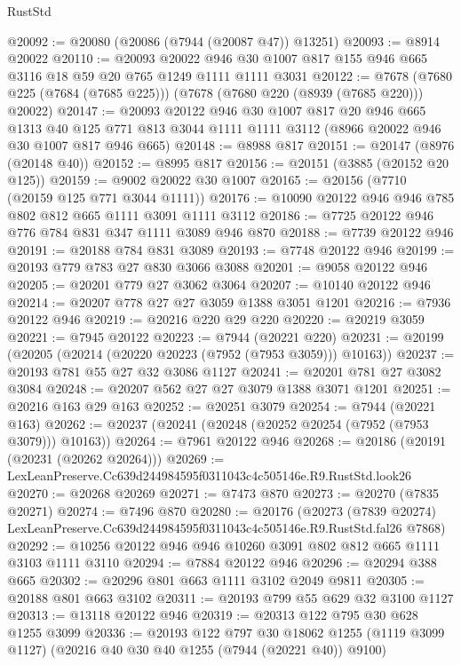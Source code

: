 \begin{lexlean}{RustStd}
\begin{coremodule}
@20092 := @20080 (@20086 (@7944 (@20087 @47)) @13251)
@20093 := @8914 @20022
@20110 := @20093
    @20022
    @946
    @30
    @1007
    @817
    @155
    @946
    @665
    @3116
    @18
    @59
    @20
    @765
    @1249
    @1111
    @1111
    @3031
@20122 := @7678 (@7680 @225 (@7684 (@7685 @225))) (@7678 (@7680 @220 (@8939 (@7685 @220))) @20022)
@20147 := @20093
    @20122
    @946
    @30
    @1007
    @817
    @20
    @946
    @665
    @1313
    @40
    @125
    @771
    @813
    @3044
    @1111
    @1111
    @3112
    (@8966 @20022 @946 @30 @1007 @817 @946 @665)
@20148 := @8988 @817
@20151 := @20147 (@8976 (@20148 @40))
@20152 := @8995 @817
@20156 := @20151 (@3885 (@20152 @20 @125))
@20159 := @9002 @20022 @30 @1007
@20165 := @20156 (@7710 (@20159 @125 @771 @3044 @1111))
@20176 := @10090 @20122 @946 @946 @785 @802 @812 @665 @1111 @3091 @1111 @3112
@20186 := @7725 @20122 @946 @776 @784 @831 @347 @1111 @3089 @946 @870
@20188 := @7739 @20122 @946
@20191 := @20188 @784 @831 @3089
@20193 := @7748 @20122 @946
@20199 := @20193 @779 @783 @27 @830 @3066 @3088
@20201 := @9058 @20122 @946
@20205 := @20201 @779 @27 @3062 @3064
@20207 := @10140 @20122 @946
@20214 := @20207 @778 @27 @27 @3059 @1388 @3051 @1201
@20216 := @7936 @20122 @946
@20219 := @20216 @220 @29 @220
@20220 := @20219 @3059
@20221 := @7945 @20122
@20223 := @7944 (@20221 @220)
@20231 := @20199 (@20205 (@20214 (@20220 @20223 (@7952 (@7953 @3059))) @10163))
@20237 := @20193 @781 @55 @27 @32 @3086 @1127
@20241 := @20201 @781 @27 @3082 @3084
@20248 := @20207 @562 @27 @27 @3079 @1388 @3071 @1201
@20251 := @20216 @163 @29 @163
@20252 := @20251 @3079
@20254 := @7944 (@20221 @163)
@20262 := @20237 (@20241 (@20248 (@20252 @20254 (@7952 (@7953 @3079))) @10163))
@20264 := @7961 @20122 @946
@20268 := @20186 (@20191 (@20231 (@20262 @20264)))
@20269 := LexLeanPreserve.Cc639d244984595f0311043c4c505146e.R9.RustStd.look26
@20270 := @20268 @20269
@20271 := @7473 @870
@20273 := @20270 (@7835 @20271)
@20274 := @7496 @870
@20280 := @20176
    (@20273 (@7839 @20274) LexLeanPreserve.Cc639d244984595f0311043c4c505146e.R9.RustStd.fal26 @7868)
@20292 := @10256 @20122 @946 @946 @10260 @3091 @802 @812 @665 @1111 @3103 @1111 @3110
@20294 := @7884 @20122 @946
@20296 := @20294 @388 @665
@20302 := @20296 @801 @663 @1111 @3102 @2049 @9811
@20305 := @20188 @801 @663 @3102
@20311 := @20193 @799 @55 @629 @32 @3100 @1127
@20313 := @13118 @20122 @946
@20319 := @20313 @122 @795 @30 @628 @1255 @3099
@20336 := @20193
    @122
    @797
    @30
    @18062
    @1255
    (@1119 @3099 @1127)
    (@20216 @40 @30 @40 @1255 (@7944 (@20221 @40)) @9100)

\end{coremodule}
\end{lexlean}
